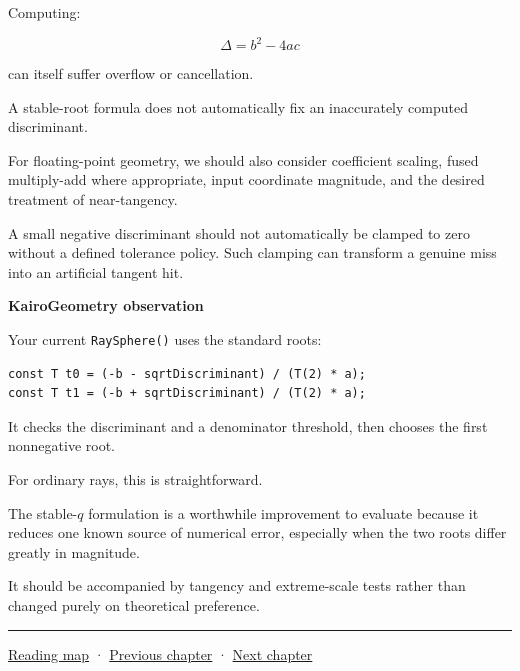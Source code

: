 Computing:

\[
\Delta=b^2-4ac
\]

can itself suffer overflow or cancellation.

A stable-root formula does not automatically fix an inaccurately computed discriminant.

For floating-point geometry, we should also consider coefficient scaling, fused multiply-add where appropriate, input coordinate magnitude, and the desired treatment of near-tangency.

A small negative discriminant should not automatically be clamped to zero without a defined tolerance policy. Such clamping can transform a genuine miss into an artificial tangent hit.

\textbf{KairoGeometry observation}

Your current \texttt{RaySphere()} uses the standard roots:

\begin{verbatim}
const T t0 = (-b - sqrtDiscriminant) / (T(2) * a);
const T t1 = (-b + sqrtDiscriminant) / (T(2) * a);
\end{verbatim}

It checks the discriminant and a denominator threshold, then chooses the first nonnegative root.

For ordinary rays, this is straightforward.

The stable-\(q\) formulation is a worthwhile improvement to evaluate because it reduces one known source of numerical error, especially when the two roots differ greatly in magnitude.

It should be accompanied by tangency and extreme-scale tests rather than changed purely on theoretical preference.

\begin{center}\rule{0.5\linewidth}{0.5pt}\end{center}

\hyperref[volume-reading-map]{Reading map} · \hyperref[04-visual-computing-ii-ch022-convex-support-mapping-and-distance]{Previous chapter} · \hyperref[04-visual-computing-ii-ch024-raytriangle-intersection]{Next chapter}

